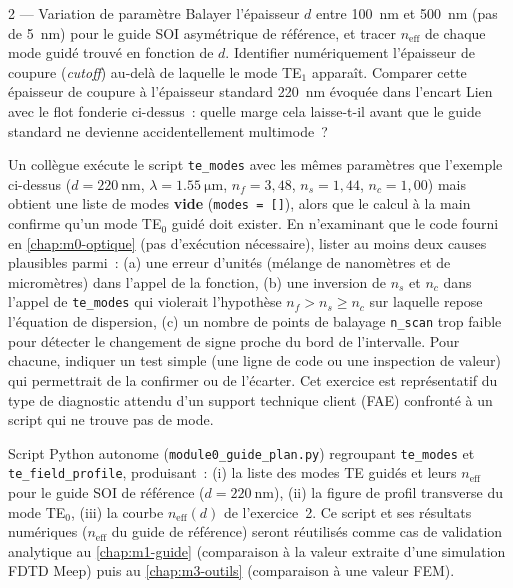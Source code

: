 \begin{exercice}{2 — Variation de paramètre}
Balayer l'épaisseur $d$ entre \SI{100}{\nano\metre} et \SI{500}{\nano\metre}
(pas de \SI{5}{\nano\metre}) pour le guide SOI asymétrique de référence, et
tracer $n_{\text{eff}}$ de chaque mode guidé trouvé en fonction de $d$.
Identifier numériquement l'épaisseur de coupure (\emph{cutoff}) au-delà de
laquelle le mode TE$_1$ apparaît. Comparer cette épaisseur de coupure à
l'épaisseur standard \SI{220}{\nano\metre} évoquée dans l'encart \og Lien
avec le flot fonderie\fg{} ci-dessus~: quelle marge cela laisse-t-il avant
que le guide standard ne devienne accidentellement multimode~?
\end{exercice}

\begin{diagnostic}
Un collègue exécute le script \texttt{te\_modes} avec les mêmes paramètres
que l'exemple ci-dessus ($d=\SI{220}{\nano\metre}$,
$\lambda=\SI{1.55}{\micro\metre}$, $n_f=3{,}48$, $n_s=1{,}44$, $n_c=1{,}00$)
mais obtient une liste de modes \textbf{vide} (\texttt{modes = []}), alors
que le calcul \og à la main\fg{} confirme qu'un mode TE$_0$ guidé doit
exister. En n'examinant que le code fourni en \cref{chap:m0-optique} (pas
d'exécution nécessaire), lister au moins deux causes plausibles parmi~:
(a) une erreur d'unités (mélange de nanomètres et de micromètres) dans
l'appel de la fonction, (b) une inversion de $n_s$ et $n_c$ dans l'appel de
\texttt{te\_modes} qui violerait l'hypothèse $n_f > n_s \geq n_c$ sur
laquelle repose l'équation de dispersion, (c) un nombre de points de
balayage \texttt{n\_scan} trop faible pour détecter le changement de signe
proche du bord de l'intervalle. Pour chacune, indiquer un test simple (une
ligne de code ou une inspection de valeur) qui permettrait de la confirmer
ou de l'écarter. Cet exercice est représentatif du type de diagnostic
attendu d'un support technique client (FAE) confronté à un script qui
\og ne trouve pas de mode\fg{}.
\end{diagnostic}

\begin{livrable}
Script Python autonome (\texttt{module0\_guide\_plan.py}) regroupant
\texttt{te\_modes} et \texttt{te\_field\_profile}, produisant~:
(i) la liste des modes TE guidés et leurs $n_{\text{eff}}$ pour le guide
SOI de référence ($d=\SI{220}{\nano\metre}$), (ii) la figure de profil
transverse du mode TE$_0$, (iii) la courbe $n_{\text{eff}}(d)$ de
l'exercice~2. Ce script et ses résultats numériques ($n_{\text{eff}}$ du
guide de référence) seront réutilisés comme cas de validation analytique
au \cref{chap:m1-guide} (comparaison à la valeur extraite d'une simulation
FDTD Meep) puis au \cref{chap:m3-outils} (comparaison à une valeur FEM).
\end{livrable}

